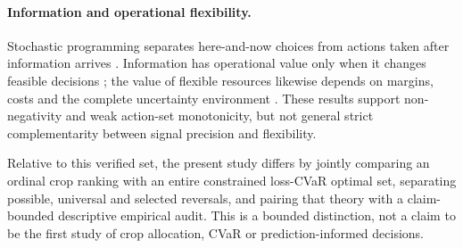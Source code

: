 \paragraph{Information and operational flexibility.}
Stochastic programming separates here-and-now choices from actions taken after information arrives \citep{dantzig1955linear}. Information has operational value only when it changes feasible decisions \citep{keisler2004value,merkhofer1975value}; the value of flexible resources likewise depends on margins, costs and the complete uncertainty environment \citep{vanmieghem1998investment}. These results support non-negativity and weak action-set monotonicity, but not general strict complementarity between signal precision and flexibility.

Relative to this verified set, the present study differs by jointly comparing an ordinal crop ranking with an entire constrained loss-CVaR optimal set, separating possible, universal and selected reversals, and pairing that theory with a claim-bounded descriptive empirical audit. This is a bounded distinction, not a claim to be the first study of crop allocation, CVaR or prediction-informed decisions.
